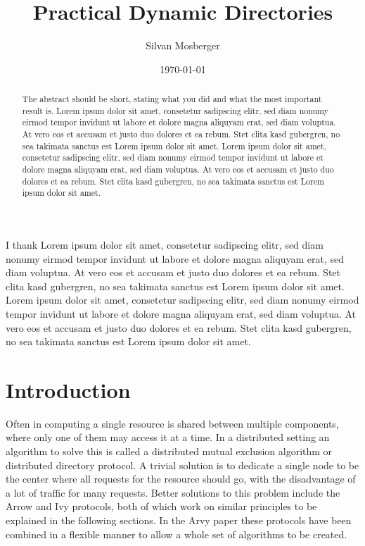 \documentclass[a4paper, oneside]{discothesis}
\title{Practical Dynamic Directories}
\author{Silvan Mosberger}
\institute{Distributed Computing Group \\[2pt]
Computer Engineering and Networks Laboratory \\[2pt]
ETH Zürich}
\date{\today}
\begin{document}
\frontmatter %
\maketitle

\cleardoublepage

\begin{acknowledgements}
	I thank Lorem ipsum dolor sit amet, consetetur sadipscing elitr, sed diam nonumy eirmod tempor invidunt ut labore et dolore magna aliquyam erat, sed diam voluptua. At vero eos et accusam et justo duo dolores et ea rebum. Stet clita kasd gubergren, no sea takimata sanctus est Lorem ipsum dolor sit amet. Lorem ipsum dolor sit amet, consetetur sadipscing elitr, sed diam nonumy eirmod tempor invidunt ut labore et dolore magna aliquyam erat, sed diam voluptua. At vero eos et accusam et justo duo dolores et ea rebum. Stet clita kasd gubergren, no sea takimata sanctus est Lorem ipsum dolor sit amet.
\end{acknowledgements}


\begin{abstract}
    The abstract should be short, stating what you did and what the most important result is.
	Lorem ipsum dolor sit amet, consetetur sadipscing elitr, sed diam nonumy eirmod tempor invidunt ut labore et dolore magna aliquyam erat, sed diam voluptua. At vero eos et accusam et justo duo dolores et ea rebum. Stet clita kasd gubergren, no sea takimata sanctus est Lorem ipsum dolor sit amet. Lorem ipsum dolor sit amet, consetetur sadipscing elitr, sed diam nonumy eirmod tempor invidunt ut labore et dolore magna aliquyam erat, sed diam voluptua. At vero eos et accusam et justo duo dolores et ea rebum. Stet clita kasd gubergren, no sea takimata sanctus est Lorem ipsum dolor sit amet.
\end{abstract}

\tableofcontents

\mainmatter

\chapter{Introduction}

Often in computing a single resource is shared between multiple components, where only one of them may access it at a time. In a distributed setting an algorithm to solve this is called a distributed mutual exclusion algorithm or distributed directory protocol. A trivial solution is to dedicate a single node to be the center where all requests for the resource should go, with the disadvantage of a lot of traffic for many requests. Better solutions to this problem include the Arrow and Ivy protocols, both of which work on similar principles to be explained in the following sections. In the Arvy paper these protocols have been combined in a flexible manner to allow a whole set of algorithms to be created.
\end{document}
